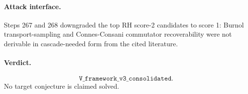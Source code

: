 \paragraph{Attack interface.}
Steps 267 and 268 downgraded the top RH score-2 candidates to score 1:
Burnol transport-sampling and Connes-Consani commutator recoverability were not
derivable in cascade-needed form from the cited literature.

\paragraph{Verdict.}
\[
\boxed{\texttt{V\_framework\_v3\_consolidated}}.
\]
No target conjecture is claimed solved.

